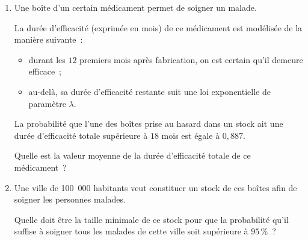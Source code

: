 \begin{enumerate}
     \item Une boîte d'un certain médicament permet de soigner un malade.
     \par
     La durée d'efficacité (exprimée en mois) de ce médicament est modélisée de la manière
     suivante~:
     \begin{itemize}
          \item durant les $12$ premiers mois après fabrication, on est certain qu'il demeure efficace~;
          \item au-delà, sa durée d'efficacité restante suit une loi exponentielle de paramètre
          $\lambda$.
     \end{itemize}
     La probabilité que l'une des boîtes prise au hasard dans un stock ait une durée d'efficacité totale supérieure à $18$ mois est égale à $0,887$.
     \par
     Quelle est la valeur moyenne de la durée d'efficacité totale de ce médicament~?
     \item Une ville de 100~000 habitants veut constituer un stock de ces boîtes afin de soigner les personnes malades.
     \par
     Quelle doit être la taille minimale de ce stock pour que la probabilité qu'il suffise à soigner tous les malades de cette ville soit supérieure à $95$\,\%~?
\end{enumerate}
